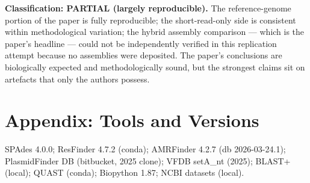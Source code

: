 \documentclass[11pt,letterpaper]{article}
\begin{document}
\textbf{Classification: PARTIAL (largely reproducible).} The reference-genome portion of the paper is fully reproducible; the short-read-only side is consistent within methodological variation; the hybrid assembly comparison --- which is the paper's headline --- could not be independently verified in this replication attempt because no assemblies were deposited. The paper's conclusions are biologically expected and methodologically sound, but the strongest claims sit on artefacts that only the authors possess.

\section*{Appendix: Tools and Versions}
SPAdes 4.0.0; ResFinder 4.7.2 (conda); AMRFinder 4.2.7 (db 2026-03-24.1); PlasmidFinder DB (bitbucket, 2025 clone); VFDB setA\_nt (2025); BLAST+ (local); QUAST (conda); Biopython 1.87; NCBI datasets (local).
\end{document}
